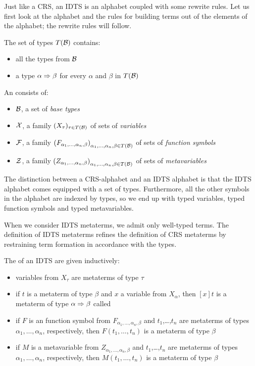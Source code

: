 Just like a CRS, an IDTS is an alphabet coupled with some rewrite
rules. Let us first look at the alphabet and the rules for building terms
out of the elements of the alphabet; the rewrite rules will follow.

\begin{definition}
  The set of types $T(\mathcal{B})$ contains:
  \begin{itemize}
  \item all the types from $\mathcal{B}$
  \item a type $\alpha \Rightarrow \beta$ for every $\alpha$ and $\beta$ in $T(\mathcal{B})$
  \end{itemize}
\end{definition}

\begin{definition}
  An  consists of:
  \begin{itemize}
  \item $\mathcal{B}$, a set of \emph{base types}
  \item $\mathcal{X}$, a family $(X_\tau)_{\tau \in T(\mathcal{B})}$ of sets of \emph{variables}
  \item $\mathcal{F}$, a family ${(F_{\alpha_1,\ldots,\alpha_n,\beta})}_{\alpha_1,\ldots,\alpha_n,\beta \in T(\mathcal{B})}$ of sets of \emph{function symbols}
  \item $\mathcal{Z}$, a family ${(Z_{\alpha_1,\ldots,\alpha_n,\beta})}_{\alpha_1,\ldots,\alpha_n,\beta \in T(\mathcal{B})}$ of sets of
    \emph{metavariables}
  \end{itemize}
\end{definition}

The distinction between a CRS-alphabet and an IDTS alphabet is that the
IDTS alphabet comes equipped with a set of types. Furthermore, all the
other symbols in the alphabet are indexed by types, so we end up with typed
variables, typed function symbols and typed metavariables.

When we consider IDTS metaterms, we admit only well-typed terms. The
definition of IDTS metaterms refines the definition of CRS metaterms by
restraining term formation in accordance with the types.

\begin{definition}
  The  of an IDTS are given inductively:
  \begin{itemize}
  \item variables from $X_\tau$ are metaterms of type $\tau$
  \item if $t$ is a metaterm of type $\beta$ and $x$ a variable from
    $X_\alpha$, then $[x]t$ is a metaterm of type $\alpha \Rightarrow \beta$ called
  \item if $F$ is an function symbol from
    $F_{\alpha_1,\ldots,\alpha_n,\beta}$ and $t_1$,\ldots,$t_n$ are
    metaterms of types $\alpha_1,\ldots,\alpha_n$, respectively, then
    $F(t_1,\ldots,t_n)$ is a metaterm of type $\beta$
  \item if $M$ is a metavariable from $Z_{\alpha_1,\ldots,\alpha_n,\beta}$
    and $t_1$,\ldots,$t_n$ are metaterms of types
    $\alpha_1,\ldots,\alpha_n$, respectively, then $M(t_1,\ldots,t_n)$ is a
    metaterm of type $\beta$
  \end{itemize}
\end{definition}


